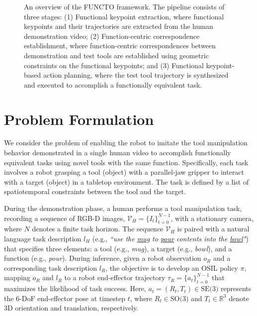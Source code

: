 \begin{figure*}[t]
  \centering
  \vspace*{-0.2in}
    \vspace*{-0.1in}
  \caption{An overview of the FUNCTO framework. The pipeline consists of three stages: (1) Functional keypoint extraction, where functional keypoints and their trajectories are extracted from the human demonstration video; (2) Function-centric correspondence establishment, where function-centric correspondences between demonstration and test tools are established using geometric constraints on the functional keypoints; and (3) Functional keypoint-based action planning, where the test tool trajectory is synthesized and executed to accomplish a functionally equivalent task.}
  \label{fig:pipeline}
  \vspace*{-0.2in}
\end{figure*} 


\section{Problem Formulation}
We consider the problem of enabling the robot to imitate the tool manipulation behavior demonstrated in a single human video to accomplish functionally equivalent tasks using novel tools with the same function. Specifically, each task involves a robot grasping a tool (object) with a parallel-jaw gripper to interact with a target (object) in a tabletop environment. The task is defined by a list of spatiotemporal constraints between the tool and the target.





During the demonstration phase, a human performs a tool manipulation task, recording a sequence of RGB-D images, $\mathcal{V}_H = \{I_t\}_{t=0}^{N-1}$, with a stationary camera, where $N$ denotes a finite task horizon. The sequence $\mathcal{V}_H$ is paired with a natural language task description $l_H$ (e.g., \textit{``use the \underline{mug} to \underline{pour} contents into the \underline{bowl}"}) that specifies three elements: a tool (e.g., \textit{mug}), a target (e.g., \textit{bowl}), and a function (e.g., \textit{pour}). During inference, given a robot observation $o_R$ and a corresponding task description $l_R$, the objective is to develop an OSIL policy $\pi$, mapping $o_R$ and $l_R$ to a robot end-effector trajectory $\tau_R = \{a_t\}_{t=0}^{N-1}$ that maximizes the likelihood of task success. Here, $a_t = (R_t, T_t) \in \text{SE(3)}$ represents the 6-DoF end-effector pose at timestep $t$, where $R_t \in \text{SO(3)}$ and $T_t \in \mathbb{R}^3$ denote 3D orientation and translation, respectively. 


